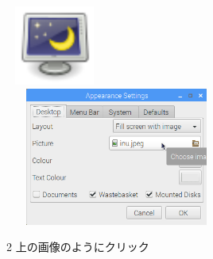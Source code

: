 \documentclass[a4paper,12pt]{jarticle}
\begin{document}
\begin{figure}
\begin{minipage}{\textwidth}
\begin{minipage}{7.737cm}
\hfill
\includegraphics[width=3.193cm,height=2.631cm]{textbook-img106.png}\\
\includegraphics[width=7.324cm,height=4.539cm]{textbook-img108.png}\\
\begin{minipage}{8.035cm}
2 上の画像のようにクリック
\end{minipage}
\end{minipage}

\end{minipage}

\begin{minipage}{\textwidth}


\end{minipage}
\end{figure}
\end{document}
